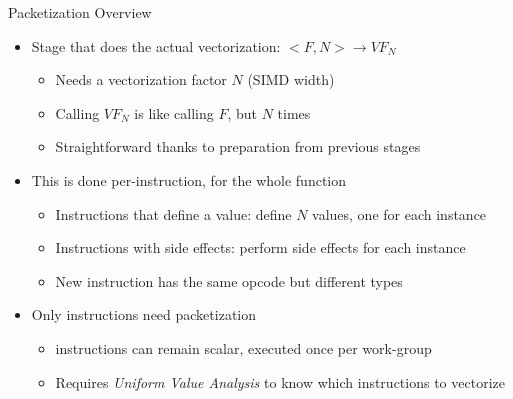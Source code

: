

\begin{frame}{Packetization Overview}

\begin{itemize}
    \item Stage that does the actual vectorization: $<F, N> \rightarrow VF_N$
    \begin{itemize}
        \item Needs a vectorization factor $N$ (SIMD width)
        \item Calling $VF_N$ is like calling $F$, but $N$ times
        \item Straightforward thanks to preparation from previous stages
    \end{itemize}
    
    \item This is done per-instruction, for the whole function
    \begin{itemize}
        \item Instructions that define a value: define $N$ values, one for each instance
        \item Instructions with side effects: perform side effects for each instance
        \item New instruction has the same opcode but different types
    \end{itemize}
    
    \item Only  instructions need packetization
    \begin{itemize}
        \item {} instructions can remain scalar, executed once per work-group
        \item Requires \emph{Uniform Value Analysis} to know which instructions to vectorize
    \end{itemize}
    
\end{itemize}

\end{frame}


